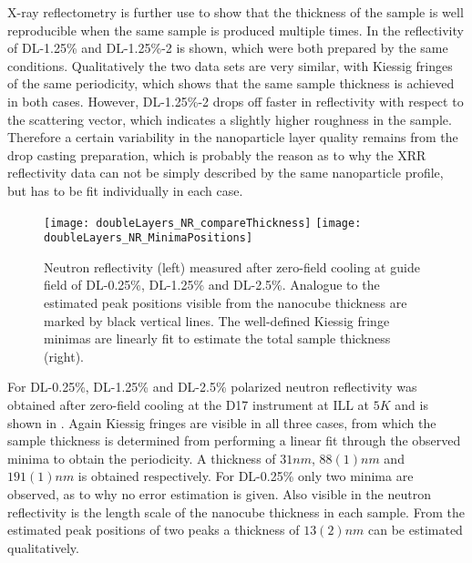 \documentclass[\main/dresen_thesis.tex]{subfiles}
\begin{document}
  X-ray reflectometry is further use to show that the thickness of the sample is well reproducible when the same sample is produced multiple times.
  In  the reflectivity of DL-1.25\% and DL-1.25\%-2 is shown, which were both prepared by the same conditions.
  Qualitatively the two data sets are very similar, with Kiessig fringes of the same periodicity, which shows that the same sample thickness is achieved in both cases.
  However, DL-1.25\%-2 drops off faster in reflectivity with respect to the scattering vector, which indicates a slightly higher roughness in the sample.
  Therefore a certain variability in the nanoparticle layer quality remains from the drop casting preparation, which is probably the reason as to why the XRR reflectivity data can not be simply described by the same nanoparticle profile, but has to be fit individually in each case.


  \begin{figure}[tb]
    \centering
    \texttt{[image: doubleLayers\_NR\_compareThickness]}
    \texttt{[image: doubleLayers\_NR\_MinimaPositions]}
    \caption{\label{fig:doublelayers:nr:thickness}Neutron reflectivity (left) measured after zero-field cooling at guide field of DL-0.25\%, DL-1.25\% and DL-2.5\%. Analogue to  the estimated peak positions visible from the nanocube thickness are marked by black vertical lines. The well-defined Kiessig fringe minimas are linearly fit to estimate the total sample thickness (right).}
  \end{figure}

  For DL-0.25\%, DL-1.25\% and DL-2.5\% polarized neutron reflectivity was obtained after zero-field cooling at the D17 instrument at ILL at $5 \unit{K}$ and is shown in .
  Again Kiessig fringes are visible in all three cases, from which the sample thickness is determined from performing a linear fit through the observed minima to obtain the periodicity.
  A thickness of $31 \unit{nm}$, $88(1) \unit{nm}$ and $191(1) \unit{nm}$ is obtained respectively.
  For DL-0.25\% only two minima are observed, as to why no error estimation is given.
  Also visible in the neutron reflectivity is the length scale of the nanocube thickness in each sample.
  From the estimated peak positions of two peaks a thickness of $13(2) \unit{nm}$ can be estimated qualitatively.
\end{document}
